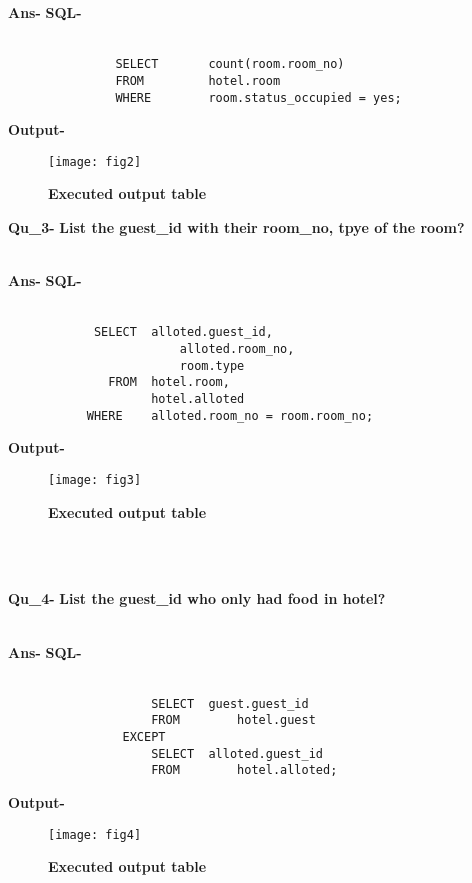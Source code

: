 \documentclass[a4,12pt]{report}
\begin{document}
\textbf{Ans-}		\textbf{SQL-} \\\

\begin{lstlisting}
			   SELECT		count(room.room_no)
			   FROM			hotel.room
			   WHERE		room.status_occupied = yes;
\end{lstlisting}

\textbf{Output-} \\			   
\begin{figure}[hbtp]
\centering
\texttt{[image: fig2]}
\caption{\textbf{{\color{red}Executed output table}}}
\end{figure}

\newpage
\textbf{Qu\_3-}  \textbf{ List the guest\_id with their room\_no, tpye of the room?} \\\

\textbf{Ans-}  \textbf{SQL-} \\\
				
\begin{lstlisting}
			SELECT	alloted.guest_id, 
						alloted.room_no, 
 		 	  			room.type
 		 	  FROM	hotel.room, 
                 	hotel.alloted
           WHERE	alloted.room_no = room.room_no;
\end{lstlisting}
				
\textbf{Output-} \\			   
\begin{figure}[hbtp]
\centering
\texttt{[image: fig3]}
\caption{\textbf{{\color{red}Executed output table}}}
\end{figure}
\\\

\textbf{Qu\_4-}  \textbf{List the guest\_id who only had food in hotel?} \\\

\textbf{Ans-}		\textbf{SQL-} \\\

\begin{lstlisting}
					SELECT	guest.guest_id
					FROM		hotel.guest
				EXCEPT 
					SELECT	alloted.guest_id 
					FROM		hotel.alloted;
\end{lstlisting}

\textbf{Output-} \\			   
\begin{figure}[hbtp]
\centering
\texttt{[image: fig4]}
\caption{\textbf{{\color{red}Executed output table}}}
\end{figure}
\\\
\end{document}

